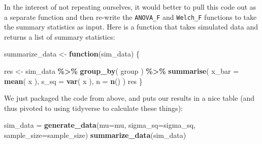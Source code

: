 \documentclass[
]{book}
\newenvironment{Shaded}{\begin{snugshade}}{\end{snugshade}}
\newcommand{\AttributeTok}[1]{\textcolor[rgb]{0.13,0.29,0.53}{#1}}
\newcommand{\ControlFlowTok}[1]{\textcolor[rgb]{0.13,0.29,0.53}{\textbf{#1}}}
\newcommand{\FunctionTok}[1]{\textcolor[rgb]{0.13,0.29,0.53}{\textbf{#1}}}
\newcommand{\NormalTok}[1]{#1}
\newcommand{\OtherTok}[1]{\textcolor[rgb]{0.56,0.35,0.01}{#1}}
\newcommand{\SpecialCharTok}[1]{\textcolor[rgb]{0.81,0.36,0.00}{\textbf{#1}}}
\begin{document}
\begin{Shaded}
\end{Shaded}

In the interest of not repeating ourselves, it would better to pull this code out as a separate function and then re-write the \texttt{ANOVA\_F} and \texttt{Welch\_F} functions to take the summary statistics as input. Here is a function that takes simulated data and returns a list of summary statistics:

\begin{Shaded}
\begin{Highlighting}[]
\NormalTok{summarize\_data }\OtherTok{\textless{}{-}} \ControlFlowTok{function}\NormalTok{(sim\_data) \{}
  
\NormalTok{  res }\OtherTok{\textless{}{-}}\NormalTok{ sim\_data }\SpecialCharTok{\%\textgreater{}\%} 
    \FunctionTok{group\_by}\NormalTok{( group ) }\SpecialCharTok{\%\textgreater{}\%}
    \FunctionTok{summarise}\NormalTok{( }\AttributeTok{x\_bar =} \FunctionTok{mean}\NormalTok{( x ),}
               \AttributeTok{s\_sq =} \FunctionTok{var}\NormalTok{( x ),}
               \AttributeTok{n =} \FunctionTok{n}\NormalTok{() )}
\NormalTok{  res}
\NormalTok{\}}
\end{Highlighting}
\end{Shaded}

We just packaged the code from above, and puts our results in a nice table (and thus pivoted to using tidyverse to calculate these things):

\begin{Shaded}
\begin{Highlighting}[]
\NormalTok{sim\_data }\OtherTok{=} \FunctionTok{generate\_data}\NormalTok{(}\AttributeTok{mu=}\NormalTok{mu, }\AttributeTok{sigma\_sq=}\NormalTok{sigma\_sq, }\AttributeTok{sample\_size=}\NormalTok{sample\_size)}
\FunctionTok{summarize\_data}\NormalTok{(sim\_data)}
\end{Highlighting}
\end{Shaded}
\end{document}
